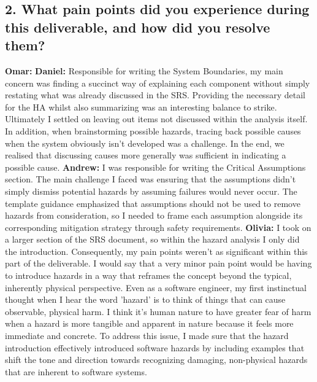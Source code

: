 \documentclass{article}
\begin{document}
\subsection*{2. What pain points did you experience during this deliverable, and how
did you resolve them?}
\bigskip
\textbf{Omar: }
\newline
\newline
\textbf{Daniel: } Responsible for writing the System Boundaries, my main concern was finding a succinct way of explaining each component without simply restating what was already discussed in the SRS. Providing the necessary detail for the HA whilst also summarizing was an interesting balance to strike. Ultimately I settled on leaving out items not discussed within the analysis itself. In addition, when brainstorming possible hazards, tracing back possible causes when the system obviously isn't developed was a challenge. In the end, we realised that discussing causes more generally was sufficient in indicating a possible cause.
\newline
\newline
\textbf{Andrew: } I was responsible for writing the Critical Assumptions section. The main challenge I faced was ensuring that the assumptions didn't simply dismiss potential hazards by assuming failures would never occur. The template guidance emphasized that assumptions should not be used to remove hazards from consideration, so I needed to frame each assumption alongside its corresponding mitigation strategy through safety requirements. 
\newline
\newline
\textbf{Olivia: } I took on a larger section of the SRS document, so within the hazard analysis I only did the introduction. Consequently, my pain points weren’t as significant within this part of the deliverable. I would say that a very minor pain point would be having to introduce hazards in a way that reframes the concept beyond the typical, inherently physical perspective. Even as a software engineer, my first instinctual thought when I hear the word 'hazard' is to think of things that can cause observable, physical harm. I think it's human nature to have greater fear of harm when a hazard is more tangible and apparent in nature because it feels more immediate and concrete. To address this issue, I made sure that the hazard introduction effectively introduced software hazards by including examples that shift the tone and direction towards recognizing damaging, non-physical hazards that are inherent to software systems.
\end{document}

